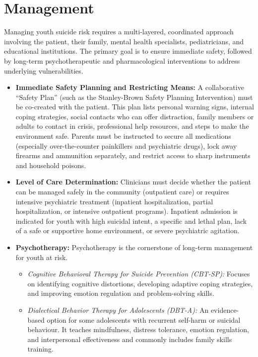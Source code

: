 \section*{Management}
Managing youth suicide risk requires a multi-layered, coordinated approach involving the patient, their family, mental health specialists, pediatricians, and educational institutions. The primary goal is to ensure immediate safety, followed by long-term psychotherapeutic and pharmacological interventions to address underlying vulnerabilities.
\begin{itemize}
    \item \textbf{Immediate Safety Planning and Restricting Means:} A collaborative ``Safety Plan'' (such as the Stanley-Brown Safety Planning Intervention) must be co-created with the patient. This plan lists personal warning signs, internal coping strategies, social contacts who can offer distraction, family members or adults to contact in crisis, professional help resources, and steps to make the environment safe. Parents must be instructed to secure all medications (especially over-the-counter painkillers and psychiatric drugs), lock away firearms and ammunition separately, and restrict access to sharp instruments and household poisons.
    \item \textbf{Level of Care Determination:} Clinicians must decide whether the patient can be managed safely in the community (outpatient care) or requires intensive psychiatric treatment (inpatient hospitalization, partial hospitalization, or intensive outpatient programs). Inpatient admission is indicated for youth with high suicidal intent, a specific and lethal plan, lack of a safe or supportive home environment, or severe psychiatric agitation.
    \item \textbf{Psychotherapy:} Psychotherapy is the cornerstone of long-term management for youth at risk.
    \begin{itemize}
        \item \textit{Cognitive Behavioral Therapy for Suicide Prevention (CBT-SP):} Focuses on identifying cognitive distortions, developing adaptive coping strategies, and improving emotion regulation and problem-solving skills.
        \item \textit{Dialectical Behavior Therapy for Adolescents (DBT-A):} An evidence-based option for some adolescents with recurrent self-harm or suicidal behaviour. It teaches mindfulness, distress tolerance, emotion regulation, and interpersonal effectiveness and commonly includes family skills training.

\end{itemize}
\end{itemize}
